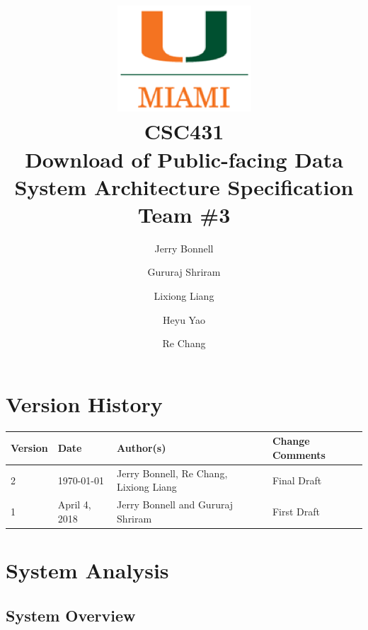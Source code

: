 \documentclass{article}
\begin{document}
\title{
	\includegraphics{images/um_logo.png} \\
	\vspace{0.1in}
	CSC431 \\
	\vspace{0.2in}
	\textbf{Download of Public-facing Data} \\
	\large System Architecture Specification \\
	Team \#3
}

\author{
	Jerry Bonnell
	\and Gururaj Shriram
	\and Lixiong Liang
	\and Heyu Yao
	\and Re Chang
}

\date{}
\maketitle

\clearpage
\section*{Version History}

\begin{tabularx}{\textwidth}{| l | l | X | l |}
	\hline
	\textbf{Version} & \textbf{Date} & \textbf{Author(s)} & \textbf{Change Comments} \\
	\hline
	2 & \today & Jerry Bonnell, Re Chang, Lixiong Liang & Final Draft \\ 
	\hline
	1 & April 4, 2018 & Jerry Bonnell and Gururaj Shriram & First Draft \\
	\hline
\end{tabularx}

\clearpage
\tableofcontents

\clearpage
\listoffigures
\listoftables

\clearpage

\section{System Analysis}

\subsection{System Overview}
\end{document}
